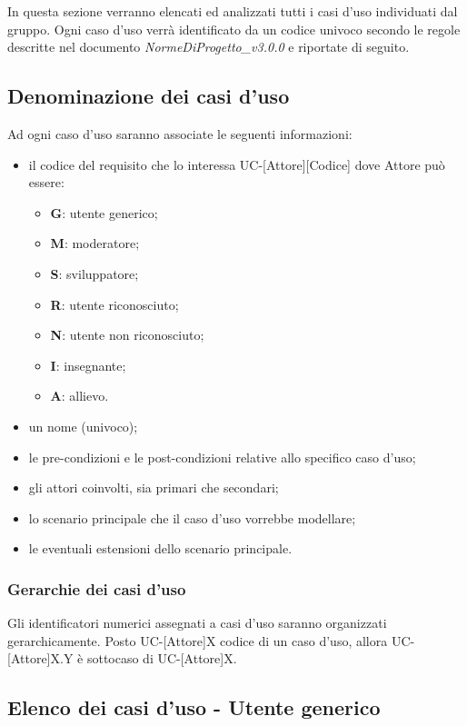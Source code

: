 In questa sezione verranno elencati ed analizzati tutti i casi d'uso individuati dal gruppo. Ogni caso d'uso verrà identificato da un codice univoco secondo le regole descritte nel documento \textit{NormeDiProgetto\_v3.0.0} e riportate di seguito. 

\subsection{Denominazione dei casi d'uso}
Ad ogni caso d'uso saranno associate le seguenti informazioni:
\begin{itemize}
\item il codice del requisito che lo interessa UC-[Attore][Codice] dove Attore può essere:
	\begin{itemize}
		\item \textbf{G}: utente generico;
		\item \textbf{M}: moderatore;
		\item \textbf{S}: sviluppatore;
		\item \textbf{R}: utente riconosciuto;
		\item \textbf{N}: utente non riconosciuto;
		\item \textbf{I}: insegnante;
		\item \textbf{A}: allievo.
	\end{itemize}
\item un nome (univoco);
\item le pre-condizioni e le post-condizioni relative allo specifico caso d'uso;
\item gli attori coinvolti, sia primari che secondari;
\item lo scenario principale che il caso d'uso vorrebbe modellare;
\item le eventuali estensioni dello scenario principale.
\end{itemize}

\subsubsection{Gerarchie dei casi d'uso} 
Gli identificatori numerici assegnati a casi d'uso saranno organizzati gerarchicamente. Posto UC-[Attore]X codice di un caso d'uso, allora UC-[Attore]X.Y è sottocaso di UC-[Attore]X.

\subsection{Elenco dei casi d'uso - Utente generico}

